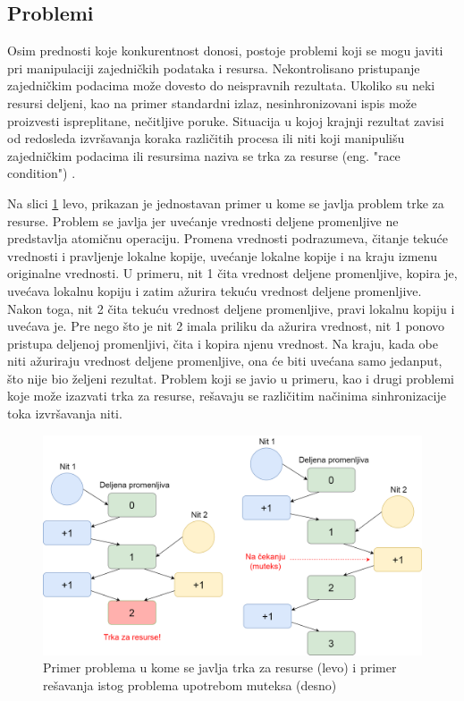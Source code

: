 \documentclass[12pt,oneside]{memoir}
\begin{document}
\subsection{Problemi}

Osim prednosti koje konkurentnost donosi, postoje problemi koji se mogu javiti pri manipulaciji zajedničkih podataka i resursa. Nekontrolisano pristupanje zajedničkim podacima može dovesto do neispravnih rezultata. Ukoliko su neki resursi deljeni, kao na primer standardni izlaz, nesinhronizovani ispis može proizvesti ispreplitane, nečitljive poruke. Situacija u kojoj krajnji rezultat zavisi od redosleda izvršavanja koraka različitih procesa ili niti koji manipulišu zajedničkim podacima ili resursima naziva se trka za resurse (eng. "race condition") \cite{os}.

Na slici \ref{fig:race} levo, prikazan je jednostavan primer u kome se javlja problem trke za resurse. Problem se javlja jer uvećanje vrednosti deljene promenljive ne predstavlja atomičnu operaciju. Promena vrednosti podrazumeva, čitanje tekuće vrednosti i pravljenje lokalne kopije, uvećanje lokalne kopije i na kraju izmenu originalne vrednosti. U primeru, nit 1 čita vrednost deljene promenljive, kopira je, uvećava lokalnu kopiju i zatim ažurira tekuću vrednost deljene promenljive. Nakon toga, nit 2 čita tekuću vrednost deljene promenljive, pravi lokalnu kopiju i uvećava je. Pre nego što je nit 2 imala priliku da ažurira vrednost, nit 1 ponovo pristupa deljenoj promenljivi, čita i kopira njenu vrednost. Na kraju, kada obe niti ažuriraju vrednost deljene promenljive, ona će biti uvećana samo jedanput, što nije bio željeni rezultat. Problem koji se javio u primeru, kao i drugi problemi koje može izazvati trka za resurse, rešavaju se različitim načinima sinhronizacije toka izvršavanja niti.

\begin{figure}
\begin{center}
\includegraphics[scale=0.22]{race.png}
\end{center}
\caption{Primer problema u kome se javlja trka za resurse (levo) i primer rešavanja istog problema upotrebom muteksa (desno) }
\label{fig:race}
\end{figure}
\end{document}
